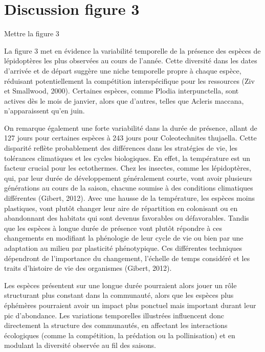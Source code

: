 \documentclass[9pt,twocolumn,twoside,]{pnas-new}
\begin{document}
\section*{Discussion figure 3}\label{discussion-figure-3}

Mettre la figure 3

La figure 3 met en évidence la variabilité temporelle de la présence des
espèces de lépidoptères les plus observées au cours de l'année. Cette
diversité dans les dates d'arrivée et de départ suggère une niche
temporelle propre à chaque espèce, réduisant potentiellement la
compétition interspécifique pour les ressources (Ziv et Smallwood,
2000). Certaines espèces, comme Plodia interpunctella, sont actives dès
le mois de janvier, alors que d'autres, telles que Acleris maccana,
n'apparaissent qu'en juin.

On remarque également une forte variabilité dans la durée de présence,
allant de 127 jours pour certaines espèces à 243 jours pour
Coleotechnites thujaella. Cette disparité reflète probablement des
différences dans les stratégies de vie, les tolérances climatiques et
les cycles biologiques. En effet, la température est un facteur crucial
pour les ectothermes. Chez les insectes, comme les lépidoptères, qui,
par leur durée de développement généralement courte, vont avoir
plusieurs générations au cours de la saison, chacune soumise à des
conditions climatiques différentes (Gibert, 2012). Avec une hausse de la
température, les espèces moins plastiques, vont plutôt changer leur aire
de répartition en colonisant ou en abandonnant des habitats qui sont
devenus favorables ou défavorables. Tandis que les espèces à longue
durée de présence vont plutôt répondre à ces changements en modifiant la
phénologie de leur cycle de vie ou bien par une adaptation au milieu par
plasticité phénotypique. Ces différentes techniques dépendront de
l'importance du changement, l'échelle de temps considéré et les traits
d'histoire de vie des organismes (Gibert, 2012).

Les espèces présentent sur une longue durée pourraient alors jouer un
rôle structurant plus constant dans la communauté, alors que les espèces
plus éphémères pourraient avoir un impact plus ponctuel mais important
durant leur pic d'abondance. Les variations temporelles illustrées
influencent donc directement la structure des communautés, en affectant
les interactions écologiques (comme la compétition, la prédation ou la
pollinisation) et en modulant la diversité observée au fil des saisons.
\end{document}
